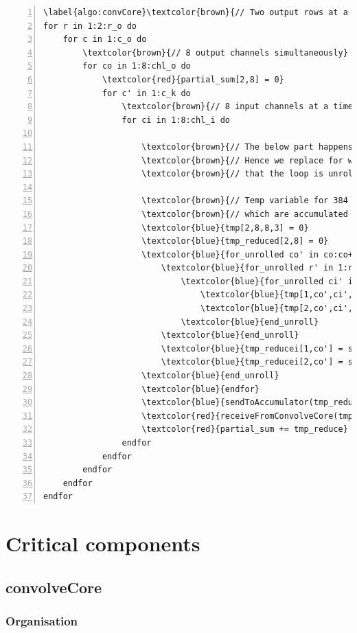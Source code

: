 \documentclass[a4paper,12pt, final]{report}
\begin{document}
\begin{Verbatim}[numbers=left,commandchars=\\\{\}]
\label{algo:convCore}\textcolor{brown}{// Two output rows at a time}
for r in 1:2:r_o do
	for c in 1:c_o do
		\textcolor{brown}{// 8 output channels simultaneously}
		for co in 1:8:chl_o do
			\textcolor{red}{partial_sum[2,8] = 0}
			for c' in 1:c_k do
				\textcolor{brown}{// 8 input channels at a time}
				for ci in 1:8:chl_i do

					\textcolor{brown}{// The below part happens in one loop of the core}
					\textcolor{brown}{// Hence we replace for with for_unrolled which signifies}
					\textcolor{brown}{// that the loop is unrolled over the range of its iterators}

					\textcolor{brown}{// Temp variable for 384 multiplications}
					\textcolor{brown}{// which are accumulated and reduced to 16 partial sums}
					\textcolor{blue}{tmp[2,8,8,3] = 0}
					\textcolor{blue}{tmp_reduced[2,8] = 0}
					\textcolor{blue}{for_unrolled co' in co:co+7 do}
						\textcolor{blue}{for_unrolled r' in 1:r_k do}
							\textcolor{blue}{for_unrolled ci' in ci:ci+7 do}
								\textcolor{blue}{tmp[1,co',ci',r'] = input[r+r'-1,c+c'-1,ci']*kernel[co',r',c',ci']}
								\textcolor{blue}{tmp[2,co',ci',r'] = input[r+r',c+c'-1,ci']*kernel[co',r',c',ci']}
							\textcolor{blue}{end_unroll}
						\textcolor{blue}{end_unroll}
						\textcolor{blue}{tmp_reducei[1,co'] = sum(tmp[1,co',:,:])}
						\textcolor{blue}{tmp_reducei[2,co'] = sum(tmp[2,co',:,:])}
					\textcolor{blue}{end_unroll}
					\textcolor{blue}{endfor}
					\textcolor{blue}{sendToAccumulator(tmp_reduce)}
					\textcolor{red}{receiveFromConvolveCore(tmp_reduce)}
					\textcolor{red}{partial_sum += tmp_reduce} \textcolor{brown}{// Element wise sum}
				endfor
			endfor
		endfor
	endfor
endfor
\end{Verbatim}

\section{Critical components}

\subsection{convolveCore}\label{sec:convCore}

\subsubsection{Organisation}
\end{document}
